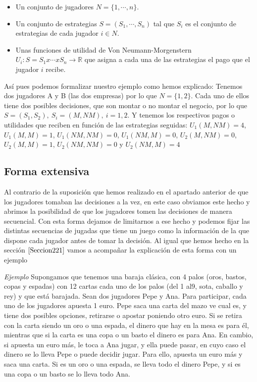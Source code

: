 \documentclass[12pt,a4paper,]{book}
\numberwithin{dummy}{section}
\theoremstyle{ocrenumbox}
\theoremstyle{blacknumex}
\theoremstyle{blacknumbox}
\theoremstyle{ocrenum}
\theoremstyle{ocrenum}
\begin{document}
\begin{itemize}
\item
  Un conjunto de jugadores \(N=\{1,\cdots,n\}\).
\item
  Un conjunto de estrategias \(S=(S_1,\cdots,S_n)\) tal que \(S_i\) es
  el conjunto de estrategias de cada jugador \(i \in N\).
\item
  Unas funciones de utilidad de Von Neumann-Morgenstern
  \(U_i:S=S_1x\cdots xS_n \rightarrow \mathbb{R}\) que asigna a cada una
  de las estrategias el pago que el jugador \(i\) recibe.
\end{itemize}

Así pues podemos formalizar nuestro ejemplo como hemos explicado:
Tenemos dos jugadores A y B (las dos empresas) por lo que \(N=\{1,2\}\).
Cada uno de ellos tiene dos posibles decisiones, que son montar o no
montar el negocio, por lo que \(S=(S_1,S_2), \ S_i=(M,NM), \ i=1,2\). Y
tenemos los respectivos pagos o utilidades que reciben en función de las
estrategias seguidas: \(U_1(M,NM)=4\), \(U_1(M,M)=1\), \(U_1(NM,NM)=0\),
\(U_1(NM,M)=0\), \(U_2(M,NM)=0\), \(U_2(M,M)=1\), \(U_2(NM,NM)=0\) y
\(U_2(NM,M)=4\)

\hypertarget{Seccion222}{%
\subsection{Forma extensiva}\label{Seccion222}}

Al contrario de la suposición que hemos realizado en el apartado
anterior de que los jugadores tomaban las decisiones a la vez, en este
caso obviamos este hecho y abrimos la posibilidad de que los jugadores
tomen las decisiones de manera secuencial. Con esta forma dejamos de
limitarnos a ese hecho y podemos fijar las distintas secuencias de
jugadas que tiene un juego como la información de la que dispone cada
jugador antes de tomar la decisión. Al igual que hemos hecho en la
sección \(\ref{Seccion221}\) vamos a acompañar la explicación de esta
forma con un ejemplo

\emph{Ejemplo} Supongamos que tenemos una baraja clásica, con 4 palos
(oros, bastos, copas y espadas) con 12 cartas cada uno de los palos (del
1 al9, sota, caballo y rey) y que está barajada. Sean dos jugadores Pepe
y Ana. Para participar, cada uno de los jugadores apuesta 1 euro. Pepe
saca una carta del mazo ve cual es, y tiene dos posibles opciones,
retirarse o apostar poniendo otro euro. Si se retira con la carta siendo
un oro o una espada, el dinero que hay en la mesa es para él, mientras
que si la carta es una copa o un basto el dinero es para Ana. En cambio,
si apuesta un euro más, le toca a Ana jugar, y ella puede pasar, en cuyo
caso el dinero se lo lleva Pepe o puede decidir jugar. Para ello,
apuesta un euro más y saca una carta. Si es un oro o una espada, se
lleva todo el dinero Pepe, y si es una copa o un basto se lo lleva todo
Ana.
\end{document}
